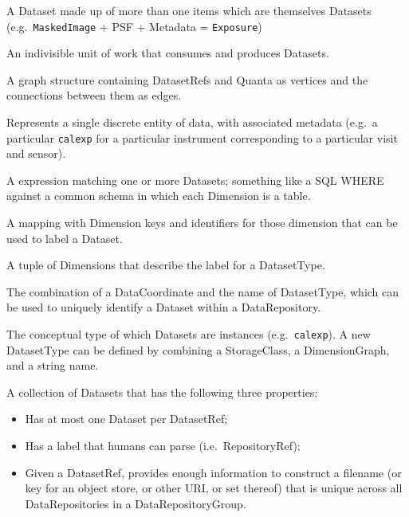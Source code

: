 \documentclass[DM,toc,lsstdraft]{lsstdoc}
\begin{document}
\begin{description}[style=nextline]

\item[Composite Dataset] A Dataset made up of more than one items which are themselves Datasets (e.g.\ \texttt{MaskedImage} + PSF + Metadata = \texttt{Exposure})

\item[Quantum] An indivisible unit of work that consumes and produces Datasets.

\item[QuantumGraph] A graph structure containing DatasetRefs and Quanta as vertices and the connections between them as edges.

\item[Dataset] Represents a single discrete entity of data, with associated metadata (e.g.\ a particular \texttt{calexp} for a particular instrument corresponding to a particular visit and sensor).

\item[DatasetExpression] A expression matching one or more Datasets; something like a SQL WHERE against a common schema in which each Dimension is a table.

\item[DataCoordinate (or DataID)] A mapping with Dimension keys and identifiers for those dimension that can be used to label a Dataset.

\item[DimensionGraph] A tuple of Dimensions that describe the label for a DatasetType.

\item[DatasetRef] The combination of a DataCoordinate and the name of DatasetType, which can be used to uniquely identify a Dataset within a DataRepository.

\item[DatasetType] The conceptual type of which Datasets are instances (e.g.\ \texttt{calexp}).  A new DatasetType can be defined by combining a StorageClass, a DimensionGraph, and a string name.

\item[DataRepository] A collection of Datasets that has the following three properties:
\begin{itemize}
\item Has at most one Dataset per DatasetRef;
\item Has a label that humans can parse (i.e.\ RepositoryRef);
\item Given a DatasetRef, provides enough information to construct a filename (or key for an object store, or other URI, or set thereof) that is unique across all DataRepositories in a DataRepositoryGroup.
\end{itemize}


\end{description}
\end{document}
